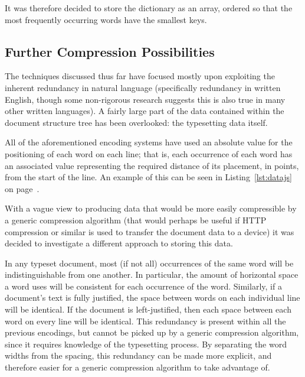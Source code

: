 It was therefore decided to store the dictionary as an array, ordered so that the most frequently occurring words have the smallest keys.

\newpage
\subsection{Further Compression Possibilities}
\label{sec:deltas}

The techniques discussed thus far have focused mostly upon exploiting the inherent redundancy in natural language (specifically redundancy in written English, though some non-rigorous research suggests this is also true in many other written languages). A fairly large part of the data contained within the document structure tree has been overlooked: the typesetting data itself.

All of the aforementioned encoding systems have used an absolute value for the positioning of each word on each line; that is, each occurrence of each word has an associated value representing the required distance of its placement, in \glspl{point}, from the start of the line. An example of this can be seen in Listing~\ref{lst:datajs} on page~\pageref{lst:datajs}.

With a vague view to producing data that would be more easily compressible by a generic compression algorithm (that would perhaps be useful if HTTP compression or similar is used to transfer the document data to a device) it was decided to investigate a different approach to storing this data.

In any typeset document, most (if not all) occurrences of the same word will be indistinguishable from one another. In particular, the amount of horizontal space a word uses will be consistent for each occurrence of the word. Similarly, if a document's text is fully justified, the space between words on each individual line will be identical. If the document is left-justified, then each space between each word on every line will be identical. This redundancy is present within all the previous encodings, but cannot be picked up by a generic compression algorithm, since it requires knowledge of the typesetting process. By separating the word widths from the spacing, this redundancy can be made more explicit, and therefore easier for a generic compression algorithm to take advantage of.

